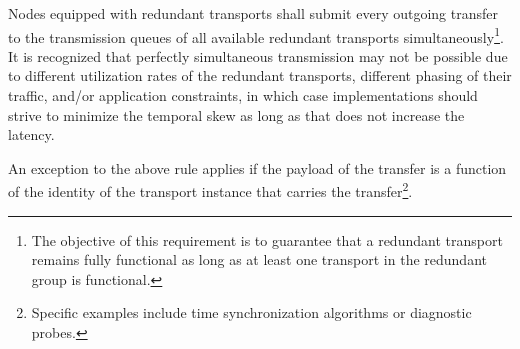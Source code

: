 Nodes equipped with redundant transports shall submit every outgoing transfer to the transmission queues of all
available redundant transports simultaneously\footnote{%
    The objective of this requirement is to guarantee that a redundant transport remains fully functional
    as long as at least one transport in the redundant group is functional.
}.
It is recognized that perfectly simultaneous transmission may not be possible due to different
utilization rates of the redundant transports, different phasing of their traffic, and/or application constraints,
in which case implementations should strive to minimize the temporal skew as long as that
does not increase the latency.

An exception to the above rule applies if the payload of the transfer is a function of
the identity of the transport instance that carries the transfer\footnote{%
    Specific examples include time synchronization algorithms or diagnostic probes.
}.

\clearpage
\clearpage
